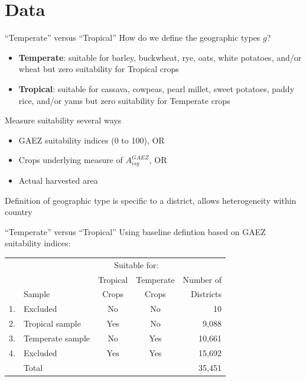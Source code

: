 \documentclass[10pt, xcolor=dvipsnames]{beamer}
\begin{document}
\section{Data}

\begin{frame}{``Temperate'' versus ``Tropical''}
How do we define the geographic types $g$?
\begin{itemize}
  \item \textbf{Temperate}: suitable for barley, buckwheat, rye, oats, white potatoes, and/or wheat but zero suitability for Tropical crops
  \item \textbf{Tropical}: suitable for cassava, cowpeas, pearl millet, sweet potatoes, paddy rice, and/or yams but zero suitability for Temperate crops
\end{itemize}
Measure suitability several ways
\begin{itemize}
  \item GAEZ suitability indices (0 to 100), OR
  \item Crops underlying measure of $A^{GAEZ}_{isg}$, OR
  \item Actual harvested area
\end{itemize}
Definition of geographic type is specific to a district, allows heterogeneity within country
\end{frame}


\begin{frame}{``Temperate'' versus ``Tropical''}
Using baseline defintion based on GAEZ suitability indices:
{\footnotesize
\begin{center}
\begin{tabular}{llccr}
\midrule
& & \multicolumn{2}{c}{Suitable for:} & \\ \cmidrule(lr){3-4}
& & Tropical & Temperate & Number of\\
& Sample & Crops    & Crops     & Districts \\ \midrule
1. & Excluded & No & No & 10 \\
2. & Tropical sample & Yes & No & 9,088 \\
3. & Temperate sample & No  & Yes & 10,661 \\
4. & Excluded & Yes & Yes & 15,692 \\ \midrule
   & Total    &     &     & 35,451 \\
\midrule
\end{tabular}
\end{center}
}
\end{frame}
\end{document}
